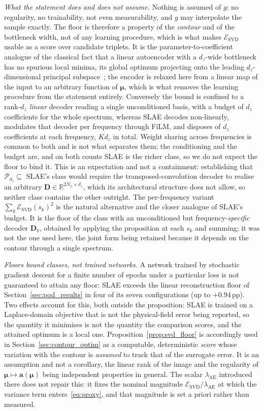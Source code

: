﻿\documentclass[a4paper,12pt]{article}
\theoremstyle{definition}
\theoremstyle{remark}
\newcommand{\vmu}{\bm{\mu}}
\newcommand{\R}{\mathbb{R}}
\begin{document}
\emph{What the statement does and does not assume.} Nothing is assumed of $g$: no regularity, no trainability, not even measurability, and $g$ may interpolate the sample exactly. The floor is therefore a property of the \emph{contour} and of the bottleneck width, not of any learning procedure, which is what makes $\mathcal{E}_{\mathrm{SVD}}$ usable as a score over candidate triplets. It is the parameter-to-coefficient analogue of the classical fact that a linear autoencoder with a $d_z$-wide bottleneck has no spurious local minima, its global optimum projecting onto the leading $d_z$-dimensional principal subspace~\cite{baldi1989}; the encoder is relaxed here from a linear map of the input to an arbitrary function of $\vmu$, which is what removes the learning procedure from the statement entirely. Conversely the bound is confined to a rank-$d_z$ \emph{linear} decoder reading a single unconditioned basis, with a budget of $d_z$ coefficients for the whole spectrum, whereas SLAE decodes non-linearly, modulates that decoder per frequency through FiLM, and disposes of $d_z$ coefficients at each frequency, $K d_z$ in total. Weight sharing across frequencies is common to both and is not what separates them; the conditioning and the budget are, and on both counts SLAE is the richer class, so we do not expect the floor to bind it. This is an expectation and not a containment: establishing that $\mathcal{P}_{d_z} \subseteq$ SLAE's class would require the transposed-convolution decoder to realise an arbitrary $\bm{D} \in \R^{2N_x \times d_z}$, which its architectural structure does not allow, so neither class contains the other outright. The per-frequency variant $\sum_k \mathcal{E}_{\mathrm{SVD}}(s_k)^2$ is the natural alternative and the closer analogue of SLAE's budget. It is the floor of the class with an unconditioned but frequency-\emph{specific} decoder $\bm{D}_k$, obtained by applying the proposition at each $s_k$ and summing; it was not the one used here, the joint form being retained because it depends on the contour through a single spectrum.

\emph{Floors bound classes, not trained networks.} A network trained by stochastic gradient descent for a finite number of epochs under a particular loss is not guaranteed to attain any floor: SLAE exceeds the linear reconstruction floor of Section~\ref{sec:pod_results} in four of its seven configurations (up to $+0.94$\,pp). Two effects account for this, both outside the proposition: SLAE is trained on a Laplace-domain objective that is not the physical-field error being reported, so the quantity it minimises is not the quantity the comparison scores, and the attained optimum is a local one. Proposition~\ref{prop:svd_floor} is accordingly used in Section~\ref{sec:contour_optim} as a computable, deterministic \emph{score} whose variation with the contour is \emph{assumed} to track that of the surrogate error. It is an assumption and not a corollary, the linear rank of the image and the regularity of $\vmu \mapsto \bm{a}(\vmu)$ being independent properties in general. The scalar $\lambda_{\mathrm{AE}}$ introduced there does not repair this: it fixes the nominal magnitude $\mathcal{E}_{\mathrm{SVD}}/\lambda_{\mathrm{AE}}$ at which the variance term enters~\eqref{eq:proxy}, and that magnitude is set a priori rather than measured.
\end{document}
